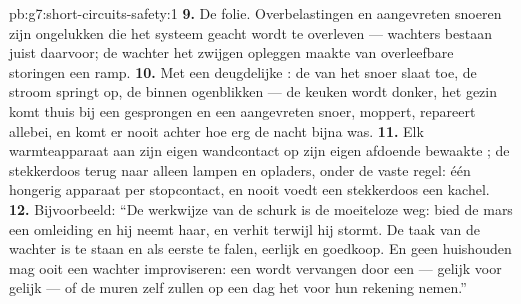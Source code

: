 \begin{solution}{pb:g7:short-circuits-safety:1}
\textbf{9.} De folie. Overbelastingen en aangevreten snoeren zijn
ongelukken die het systeem geacht wordt te overleven --- wachters
bestaan juist daarvoor; de wachter het zwijgen opleggen maakte van
overleefbare storingen een ramp.
\textbf{10.} Met een deugdelijke : de  van het
snoer slaat toe, de stroom springt op, de   binnen
ogenblikken --- de keuken wordt donker, het gezin komt thuis bij een
gesprongen  en een aangevreten snoer, moppert, repareert
allebei, en komt er nooit achter hoe erg de nacht bijna was.
\textbf{11.} Elk warmteapparaat aan zijn eigen wandcontact op zijn
eigen afdoende bewaakte ; de stekkerdoos terug naar alleen lampen
en opladers, onder de vaste regel: één hongerig apparaat per
stopcontact, en nooit voedt een stekkerdoos een kachel.
\textbf{12.} Bijvoorbeeld: ``De werkwijze van de schurk is de
moeiteloze weg: bied de mars een omleiding en hij neemt haar, en
verhit terwijl hij stormt. De taak van de wachter is  te
staan en als eerste te falen, eerlijk en goedkoop. En geen huishouden
mag ooit een wachter improviseren: een  wordt vervangen door
een  --- gelijk voor gelijk --- of de muren zelf zullen op een
dag het  voor hun rekening nemen.''
\end{solution}
